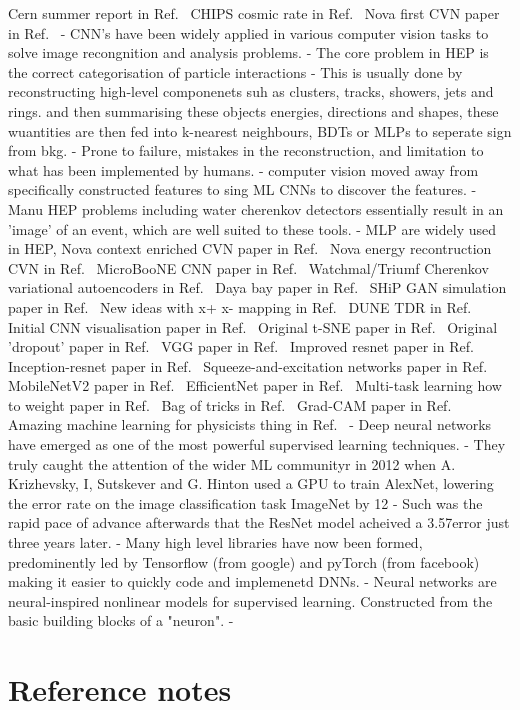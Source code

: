 Cern summer report in Ref.~\cite{theodore2016}
CHIPS cosmic rate in Ref.~\cite{son2013}
Nova first CVN paper in Ref.~\cite{aurisano2016}
- CNN's have been widely applied in various computer vision tasks to solve image recongnition and analysis problems.
- The core problem in HEP is the correct categorisation of particle interactions
- This is usually done by reconstructing high-level componenets suh as clusters, tracks, showers, jets and rings. and
then summarising these objects energies, directions and shapes, these wuantities are then fed into k-nearest neighbours,
BDTs or MLPs to seperate sign from bkg.
- Prone to failure, mistakes in the reconstruction, and limitation to what has been implemented by humans.
- computer vision moved away from specifically constructed features to sing ML CNNs to discover the features.
- Manu HEP problems including water cherenkov detectors essentially result in an 'image' of an event, which are well suited to these tools.
- MLP are widely used in HEP,
Nova context enriched CVN paper in Ref.~\cite{psihas2019}
Nova energy recontruction CVN in Ref.~\cite{baldi2019}
MicroBooNE CNN paper in Ref.~\cite{acciarri2017}
Watchmal/Triumf Cherenkov variational autoencoders in Ref.~\cite{abhishek2019}
Daya bay paper in Ref.~\cite{racah2016}
SHiP GAN simulation paper in Ref.~\cite{ahdida2019}
New ideas with x+ x- mapping in Ref.~\cite{berns2020}
DUNE TDR in Ref.~\cite{abi2020}
Initial CNN visualisation paper in Ref.~\cite{zeiler2013}
Original t-SNE paper in Ref.~\cite{maaten2008}
Original 'dropout' paper in Ref.~\cite{hinton2012}
VGG paper in Ref.~\cite{simonyan2014}
Improved resnet paper in Ref.~\cite{he2016}
Inception-resnet paper in Ref.~\cite{szegedy2016}
Squeeze-and-excitation networks paper in Ref.~\cite{hu2017}
MobileNetV2 paper in Ref.~\cite{sandler2018}
EfficientNet paper in Ref.~\cite{tan2019}
Multi-task learning how to weight paper in Ref.~\cite{kendall2017}
Bag of tricks in Ref.~\cite{he2018}
Grad-CAM paper in Ref.~\cite{elvaraju2019}
Amazing machine learning for physicists thing in Ref.~\cite{mehta2019}
- Deep neural networks have emerged as one of the most powerful supervised learning techniques.
- They truly caught the attention of the wider ML communityr in 2012 when A. Krizhevsky, I, Sutskever and G. Hinton used a GPU to train
AlexNet, lowering the error rate on the image classification task ImageNet by 12%
- Such was the rapid pace of advance afterwards that the ResNet model acheived a 3.57\percent error just three years later.
- Many high level libraries have now been formed, predominently led by Tensorflow (from google) and pyTorch (from facebook) making it easier to quickly code and implemenetd DNNs.
- Neural networks are neural-inspired nonlinear models for supervised learning. Constructed from the basic building blocks of a "neuron".
-


\section{Reference notes}